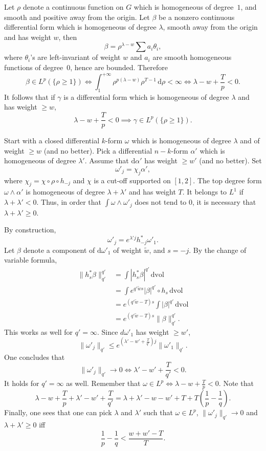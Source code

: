 \documentclass[11pt]{article}
\theoremstyle{definition}
\numberwithin{equation}{section}
\numberwithin{figure}{section}
\numberwithin{table}{section}
\newcommand{\dd}{\mathrm{d}}
\newcommand{\drho}{\dd \rho}
\newcommand{\dalpha}{\dd \alpha}
\newcommand{\dvol}{\dd \mathrm{vol}}
\begin{document}
Let $\rho$ denote a continuous function on $G$ which is homogeneous of degree~$1$, and smooth and positive away from the origin. Let $\beta$ be a nonzero continuous differential form which is homogeneous of degree $\lambda$, smooth away from the origin and has weight $w$, then
\[
\beta=\rho^{\lambda-w}\sum a_i\theta_i,
\]
where $\theta_i$'s are left-invariant of weight $w$ and $a_i$ are smooth homogeneous functions of degree~$0$, hence are bounded. Therefore
\[
\beta\in L^p(\{\rho\geq 1\}) \iff
\int_{1}^{+\infty}\rho^{p(\lambda-w)}\rho^{T-1}\, \drho<\infty
\iff \lambda-w +\frac{T}{p}<0.
\]
It follows that if $\gamma$ is a differential form which is homogeneous of degree $\lambda$ and has weight $\geq w$,
\begin{equation}\label{eq:16}
\lambda-w +\frac{T}{p}<0 \implies \gamma\in L^p(\{\rho\geq 1\}).
\end{equation}

Start with a closed differential $k$-form $\omega$ which is homogeneous of degree $\lambda$ and of weight $\geq w$ (and no better). Pick a differential $n-k$-form $\alpha'$ which is homogeneous of degree $\lambda'$. Assume that $\dalpha'$ has weight $\geq w'$ (and no better). Set
\[
\omega'_j=\chi_j \alpha',
\]
where $\chi_j=\chi\circ\rho\circ h_{-j}$ and $\chi$ is a cut-off supported on $[1,2]$. The top degree form $\omega\wedge \alpha'$ is homogeneous of degree $\lambda+\lambda'$ and has weight $T$. It belongs to $L^1$ if $\lambda+\lambda'<0$. Thus, in order that $\int\omega\wedge \omega'_j$ does not tend to $0$, it is necessary that $\lambda+\lambda'\geq 0$.

By construction,
\[
\omega'_j=e^{\lambda'j} h_{-j}^*\omega'_1.
\]
Let $\beta$ denote a component of $\dd\omega'_1$ of weight $\tilde w$, and $s=-j$. By the change of variable formula,
\begin{align*}
\| h_s^*\beta\|_{q'}^{q'} &= \int | h_s^*\beta|^{q'}\,\dvol\\
&= \int e^{q'{\tilde w}s}|\beta|^{q'}\circ h_s\,\dvol\\
&= e^{(q'{\tilde w}-T)s}\int |\beta|^{q'}\,\dvol\\
&= e^{(q'{\tilde w}-T)s}\|\beta\|_{q'}^{q'}.
\end{align*}
This works as well for $q'=\infty$. Since $d\omega'_1$ has weight $\geq w'$,
\[
\|\omega'_j\|_{q'}\leq e^{(\lambda'-w'+\frac{T}{q'})j}\|\omega'_1\|_{q'}.
\]
One concludes that
\[
\|\omega'_j\|_{q'}\to 0 \iff \lambda'-w'+\frac{T}{q'}<0.
\]
It holds for $q'=\infty$ as well. Remember that $\omega\in L^p \iff \lambda-w+\frac{T}{p}<0$. Note that
\[
\lambda-w+\frac{T}{p}+\lambda'-w'+\frac{T}{q'} =\lambda+\lambda'-w-w'+T+T\left(\frac{1}{p}-\frac{1}{q}\right).
\]
Finally, one sees that one can pick $\lambda$ and $\lambda'$ such that $\omega\in L^p$, $\|\omega'_j\|_{q'}\to 0$ and $\lambda+\lambda'\geq 0$ iff
\begin{equation}\label{eq:17}
\frac{1}{p}-\frac{1}{q}<\frac{w+w'-T}{T}.
\end{equation}
\end{document}

